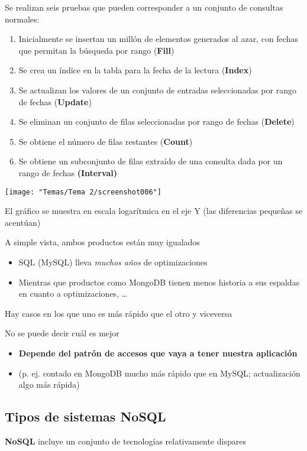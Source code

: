 Se realizan seis pruebas que pueden corresponder a un conjunto de consultas normales:
\begin{enumerate}[label=\arabic*)]
	\item Inicialmente se insertan un millón de elementos generados al azar, con fechas que permitan la búsqueda por rango (\textbf{Fill})
	\item  Se crea un índice en la tabla para la fecha de la lectura (\textbf{Index})
	\item  Se actualizan los valores de un conjunto de entradas seleccionadas por rango de fechas (\textbf{Update})
	\item  Se eliminan un conjunto de filas seleccionadas por rango de fechas (\textbf{Delete})
	\item  Se obtiene el número de filas restantes (\textbf{Count})
	\item  Se obtiene un subconjunto de filas extraído de una consulta dada por un rango de fechas \textbf{(Interval)}
\end{enumerate}
\begin{center}
	\texttt{[image: "Temas/Tema 2/screenshot006"]}
\end{center}
El gráfico se muestra en escala logarítmica en el eje Y (las diferencias pequeñas se acentúan)

A simple vista, ambos productos están muy igualados
\begin{itemize}
\item SQL (MySQL) lleva \textit{muchos años} de optimizaciones
\item Mientras que productos como MongoDB tienen menos historia a sus espaldas en cuanto a optimizaciones, \dots
\end{itemize}
Hay casos en los que uno es más rápido que el otro y viceversa

No se puede decir cuál es mejor
\begin{itemize}
	\item \textbf{Depende del patrón de accesos que vaya a tener nuestra aplicación}
	\item (p. ej. contado en MongoDB mucho más rápido que en MySQL; actualización algo más rápida)
\end{itemize}
\subsection{Tipos de sistemas NoSQL}
\textbf{NoSQL} incluye un conjunto de tecnologías relativamente dispares

